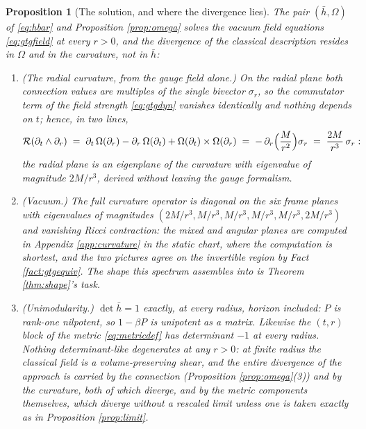 \documentclass[11pt]{article}
\newtheorem{proposition}[theorem]{Proposition}
\theoremstyle{definition}
\newcommand{\hb}{\bar{h}}
\begin{document}
\begin{proposition}[The solution, and where the divergence lies]\label{prop:solution}
The pair $(\hb, \Omega)$ of \eqref{eq:hbar} and Proposition \ref{prop:omega} solves the vacuum field equations \eqref{eq:gtgfield} at every $r > 0$, and the divergence of the classical description resides in $\Omega$ and in the curvature, not in $\hb$:
\begin{enumerate}
\item (The radial curvature, from the gauge field alone.) On the radial plane both connection values are multiples of the single bivector $\sigma_r$, so the commutator term of the field strength \eqref{eq:gtgdyn} vanishes identically and nothing depends on $t$; hence, in two lines,
\[
\mathcal{R}(\partial_t \wedge \partial_r)
\;=\; \partial_t\,\Omega(\partial_r) - \partial_r\,\Omega(\partial_t) + \Omega(\partial_t)\times\Omega(\partial_r)
\;=\; -\,\partial_r\Bigl(\frac{M}{r^2}\Bigr)\sigma_r
\;=\; \frac{2M}{r^3}\,\sigma_r :
\]
the radial plane is an eigenplane of the curvature with eigenvalue of magnitude $2M/r^3$, derived without leaving the gauge formalism.
\item (Vacuum.) The full curvature operator is diagonal on the six frame planes with eigenvalues of magnitudes $(2M/r^3, M/r^3, M/r^3, M/r^3, M/r^3, 2M/r^3)$ and vanishing Ricci contraction: the mixed and angular planes are computed in Appendix \ref{app:curvature} in the static chart, where the computation is shortest, and the two pictures agree on the invertible region by Fact \ref{fact:gtgequiv}. The shape this spectrum assembles into is Theorem \ref{thm:shape}'s task.
\item (Unimodularity.) $\det \hb = 1$ exactly, at every radius, horizon included: $P$ is rank-one nilpotent, so $1 - \beta P$ is unipotent as a matrix. Likewise the $(t,r)$ block of the metric \eqref{eq:metricdef} has determinant $-1$ at every radius. Nothing determinant-like degenerates at any $r > 0$: at finite radius the classical field is a volume-preserving shear, and the entire divergence of the approach is carried by the connection (Proposition \ref{prop:omega}(3)) and by the curvature, both of which diverge, and by the metric components themselves, which diverge without a rescaled limit unless one is taken exactly as in Proposition \ref{prop:limit}.
\end{enumerate}
\end{proposition}
\end{document}
